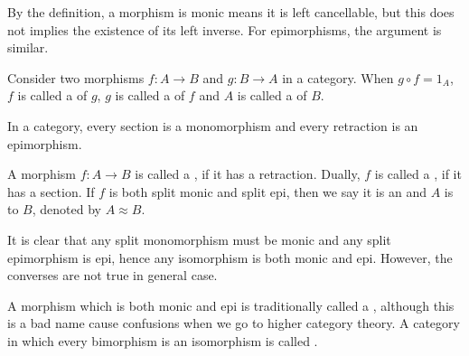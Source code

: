   By the definition, a morphism is monic means it is left cancellable, but this does not implies the existence of its left inverse. For epimorphisms, the argument is similar.
  \begin{defn}
    Consider two morphisms $f\colon A \to B$ and $g\colon B \to A$ in a category. When $g \circ f = 1_A$, $f$ is called a  of $g$, $g$ is called a  of $f$ and $A$ is called a  of $B$.
  \end{defn}
  \begin{prop}
    In a category, every section is a monomorphism and every retraction is an epimorphism.
  \end{prop}
  \begin{defn}
    A morphism $f\colon A\to B$ is called a , if it has a retraction.
    Dually, $f$  is called a , if it has a section.
    If $f$ is both split monic and split epi, then we say it is an  and $A$ is  to $B$, denoted by $A\approx B$.  
  \end{defn}
  \begin{rem}
    It is clear that any split monomorphism must be monic and any split epimorphism is epi, hence any isomorphism is both monic and epi. However, the converses are not true in general case.

    A morphism which is both monic and epi is traditionally called a , although this is a bad name cause confusions when we go to higher category theory. A category in which every bimorphism is an isomorphism is called .
  \end{rem}

